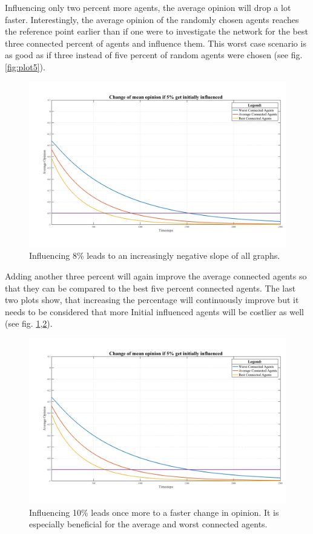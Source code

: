 \documentclass[11pt]{article}
\begin{document}
Influencing only two percent more agents, the average opinion will drop a lot faster. Interestingly, the average opinion of the randomly chosen agents reaches the reference point earlier than if one were to investigate the network for the best three connected percent of agents and influence them. This worst case scenario is as good as if three instead of five percent of random agents were chosen (see fig. \ref{fig:plot5}).

\begin{figure}
	\centering
	\includegraphics[width=\textwidth]{Graphs/5percent.png}
	\caption{Influencing 8\% leads to an increasingly negative slope of all graphs.}
	\label{fig:plot8}
\end{figure}

Adding another three percent will again improve the average connected agents so that they can be compared to the best five percent connected agents. The last two plots show, that increasing the percentage will continuously improve but it needs to be considered that more Initial influenced agents will be costlier as well (see fig. \ref{fig:plot8},\ref{fig:plot10}).

\begin{figure}
	\centering
	\includegraphics[width=\textwidth]{Graphs/5percent.png}
	\caption{Influencing 10\% leads once more to a faster change in opinion. It is especially beneficial for the average and worst connected agents.}
	\label{fig:plot10}
\end{figure}
\end{document}

